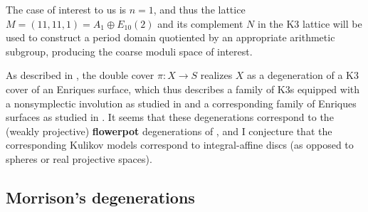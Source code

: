 \documentclass[../../main.tex]{subfiles}
\begin{document}
\begin{remark}
The case of interest to us is $n=1$, and thus the lattice $M = (11, 11, 1) = A_1 \oplus E_{10}(2)$ and its complement $N$ in the K3 lattice will be used to construct a period domain quotiented by an appropriate arithmetic subgroup, producing the coarse moduli space of interest.
\end{remark}


\begin{remark}
As described in \cite{DZ99}, the double cover $\pi: X\to S$ realizes $X$ as a degeneration of a K3 cover of an Enriques surface, which thus describes a family of K3s equipped with a nonsymplectic involution as studied in \cite{AE22} and a corresponding family of Enriques surfaces as studied in \cite{AEGS23}.
It seems that these degenerations correspond to the (weakly projective) \textbf{flowerpot} degenerations of \cite{Mor81}, and I conjecture that the corresponding Kulikov models correspond to integral-affine discs (as opposed to spheres or real projective spaces).
\end{remark}


\subsection{Morrison's degenerations}

\end{document}
